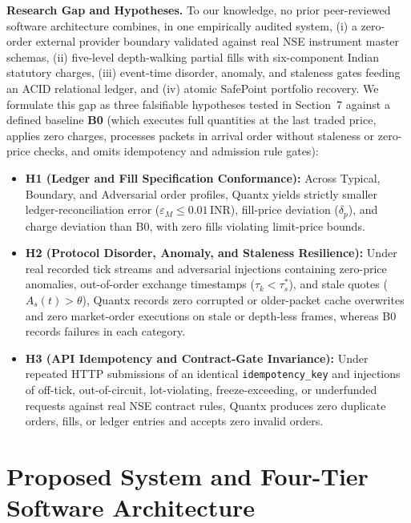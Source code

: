 \documentclass[journal,onecolumn,10pt]{IEEEtran}
\newcommand{\thinunit}[2]{#1\,\text{#2}}
\begin{document}
\textbf{Research Gap and Hypotheses.} To our knowledge, no prior peer-reviewed software architecture combines, in one empirically audited system, (i) a zero-order external provider boundary validated against real NSE instrument master schemas, (ii) five-level depth-walking partial fills with six-component Indian statutory charges, (iii) event-time disorder, anomaly, and staleness gates feeding an ACID relational ledger, and (iv) atomic SafePoint portfolio recovery. We formulate this gap as three falsifiable hypotheses tested in Section~7 against a defined baseline \textbf{B0} (which executes full quantities at the last traded price, applies zero charges, processes packets in arrival order without staleness or zero-price checks, and omits idempotency and admission rule gates):
\begin{itemize}
  \item \textbf{H1 (Ledger and Fill Specification Conformance):} Across Typical, Boundary, and Adversarial order profiles, Quantx yields strictly smaller ledger-reconciliation error ($\varepsilon_M \le \thinunit{0.01}{INR}$), fill-price deviation ($\delta_p$), and charge deviation than B0, with zero fills violating limit-price bounds.
  \item \textbf{H2 (Protocol Disorder, Anomaly, and Staleness Resilience):} Under real recorded tick streams and adversarial injections containing zero-price anomalies, out-of-order exchange timestamps ($\tau_k < \tau^*_s$), and stale quotes ($A_s(t) > \theta$), Quantx records zero corrupted or older-packet cache overwrites and zero market-order executions on stale or depth-less frames, whereas B0 records failures in each category.
  \item \textbf{H3 (API Idempotency and Contract-Gate Invariance):} Under repeated HTTP submissions of an identical \texttt{idempotency\_key} and injections of off-tick, out-of-circuit, lot-violating, freeze-exceeding, or underfunded requests against real NSE contract rules, Quantx produces zero duplicate orders, fills, or ledger entries and accepts zero invalid orders.
\end{itemize}

\section{Proposed System and Four-Tier Software Architecture}
\end{document}
